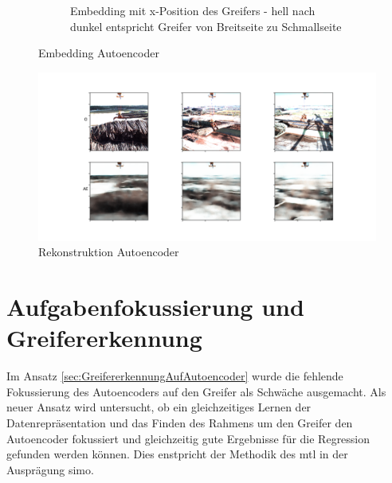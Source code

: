 \begin{figure}[h]
\begin{subfigure}[c]{0.49\textwidth}
			\caption{Embedding mit x-Position des Greifers - hell nach dunkel entspricht Greifer von Breitseite zu Schmallseite}
			\label{img:Emb_x_AE}	
		\end{subfigure}
		\caption{Embedding Autoencoder}
		\label{img:EmbeddingAE_V}
	\end{figure}
	
	\begin{figure}[h]
		\centering
		\includegraphics[width=1\textwidth, center]{bilder/Hauptteil/Autoencoder_Grappel_Detection/OriginalPicturesAndReconstruction.png}
		\caption{Rekonstruktion Autoencoder}
		\label{img:RekonstruktionAE}
	\end{figure}  
	
	
	
	\section{Aufgabenfokussierung und Greifererkennung}
	\label{sec:MultiTaskGreifererkennung}
	Im Ansatz \ref{sec:GreifererkennungAufAutoencoder} wurde die fehlende Fokussierung des Autoencoders auf den Greifer als Schwäche ausgemacht. Als neuer Ansatz wird untersucht, ob ein gleichzeitiges Lernen der Datenrepräsentation und das Finden des Rahmens um den Greifer den Autoencoder fokussiert und gleichzeitig gute Ergebnisse für die Regression gefunden werden können. Dies enstpricht der Methodik des \ac{mtl} in der Ausprägung \ac{simo}.
	
